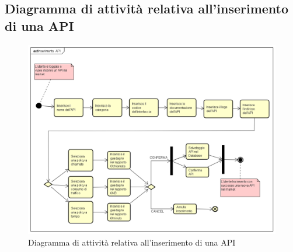 \newpage
\subsection{Diagramma di attività relativa all'inserimento di una API}
\begin{figure}[h]
	\centering
	\includegraphics[width=1.0\linewidth]{"IMG/Inserimento_API"}
	\caption{Diagramma di attività relativa all'inserimento di una API}
\end{figure}



